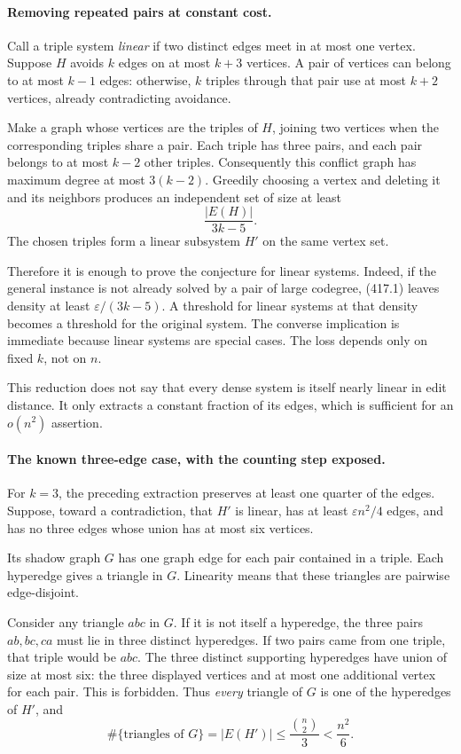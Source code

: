 \documentclass[11pt]{article}
\begin{document}
\paragraph{Removing repeated pairs at constant cost.}
Call a triple system \emph{linear} if two distinct edges meet in at most one vertex. Suppose $H$ avoids $k$ edges on at most $k+3$ vertices. A pair of vertices can belong to at most $k-1$ edges: otherwise, $k$ triples through that pair use at most $k+2$ vertices, already contradicting avoidance.

Make a graph whose vertices are the triples of $H$, joining two vertices when the corresponding triples share a pair. Each triple has three pairs, and each pair belongs to at most $k-2$ other triples. Consequently this conflict graph has maximum degree at most $3(k-2)$. Greedily choosing a vertex and deleting it and its neighbors produces an independent set of size at least
\[
 \frac{|E(H)|}{3k-5}.
 \tag{417.1}
\]
The chosen triples form a linear subsystem $H'$ on the same vertex set.

Therefore it is enough to prove the conjecture for linear systems. Indeed, if the general instance is not already solved by a pair of large codegree, (417.1) leaves density at least $\varepsilon/(3k-5)$. A threshold for linear systems at that density becomes a threshold for the original system. The converse implication is immediate because linear systems are special cases. The loss depends only on fixed $k$, not on $n$.

This reduction does not say that every dense system is itself nearly linear in edit distance. It only extracts a constant fraction of its edges, which is sufficient for an $o(n^2)$ assertion.

\paragraph{The known three-edge case, with the counting step exposed.}
For $k=3$, the preceding extraction preserves at least one quarter of the edges. Suppose, toward a contradiction, that $H'$ is linear, has at least $\varepsilon n^2/4$ edges, and has no three edges whose union has at most six vertices.

Its shadow graph $G$ has one graph edge for each pair contained in a triple. Each hyperedge gives a triangle in $G$. Linearity means that these triangles are pairwise edge-disjoint.

Consider any triangle $abc$ in $G$. If it is not itself a hyperedge, the three pairs $ab,bc,ca$ must lie in three distinct hyperedges. If two pairs came from one triple, that triple would be $abc$. The three distinct supporting hyperedges have union of size at most six: the three displayed vertices and at most one additional vertex for each pair. This is forbidden. Thus \emph{every} triangle of $G$ is one of the hyperedges of $H'$, and
\[
 \#\{\text{triangles of }G\}=|E(H')|
 \le \frac{\binom n2}{3}<\frac{n^2}{6}.
 \tag{417.2}
\]
\end{document}
